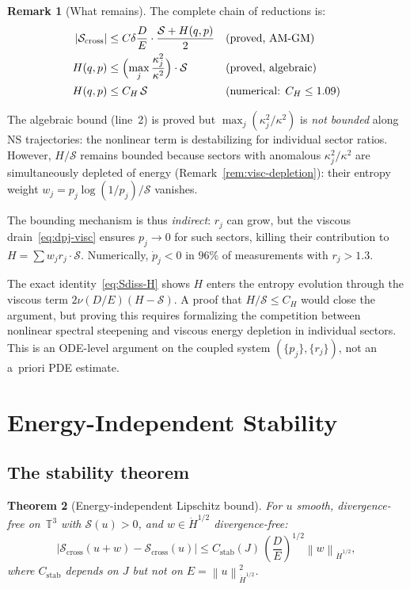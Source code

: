 \documentclass[11pt]{article}
\newtheorem{theorem}{Theorem}[section]
\theoremstyle{definition}
\newtheorem{remark}[theorem]{Remark}
\newcommand{\T}{\mathbb{T}}
\newcommand{\norm}[1]{\left\| #1 \right\|}
\newcommand{\Hdot}[1]{\dot{H}^{#1}}
\newcommand{\cS}{\mathcal{S}}
\begin{document}
\begin{remark}[What remains]
\label{rem:what-remains-prop}
The complete chain of reductions is:
\begin{align}
|\cS_{\mathrm{cross}}|
&\leq C\delta\frac{D}{E}\cdot
\frac{\cS + H(q,p)}{2}
&&\text{(proved, AM-GM)}
\nonumber\\
H(q,p) &\leq \Bigl(\max_j\frac{\kappa_j^2}{\kappa^2}\Bigr)
\cdot\cS
&&\text{(proved, algebraic)}
\nonumber\\
H(q,p) &\leq C_H\,\cS
&&\text{(numerical: $C_H \leq 1.09$)}
\end{align}

The algebraic bound (line~2) is proved but
$\max_j(\kappa_j^2/\kappa^2)$ is \emph{not bounded} along
NS trajectories: the nonlinear term is destabilizing
for individual sector ratios.  However, $H/\cS$ remains
bounded because sectors with anomalous $\kappa_j^2/\kappa^2$
are simultaneously depleted of energy
(Remark~\ref{rem:visc-depletion}): their entropy weight
$w_j = p_j\log(1/p_j)/\cS$ vanishes.

The bounding mechanism is thus \emph{indirect}: $r_j$ can
grow, but the viscous drain~\eqref{eq:dpj-visc}
ensures $p_j \to 0$ for such sectors, killing their
contribution to $H = \sum w_j r_j \cdot \cS$.
Numerically, $\dot{p}_j < 0$ in $96\%$ of measurements
with $r_j > 1.3$.

The exact identity~\eqref{eq:Sdiss-H} shows $H$ enters
the entropy evolution through the viscous term
$2\nu(D/E)(H - \cS)$.  A proof that $H/\cS \leq C_H$
would close the argument, but proving this requires
formalizing the competition between nonlinear spectral
steepening and viscous energy depletion in individual
sectors.  This is an ODE-level argument on the coupled
system $(\{p_j\}, \{r_j\})$, not an a~priori PDE estimate.
\end{remark}


\section{Energy-Independent Stability}
\label{sec:stability}

\subsection{The stability theorem}

\begin{theorem}[Energy-independent Lipschitz bound]
\label{thm:stability}
For $u$ smooth, divergence-free on~$\T^3$ with
$\cS(u) > 0$, and $w \in \Hdot{1/2}$ divergence-free:
\begin{equation}\label{eq:stability}
|\cS_{\mathrm{cross}}(u+w) - \cS_{\mathrm{cross}}(u)|
\leq C_{\mathrm{stab}}(J)\,
\left(\frac{D}{E}\right)^{1/2}\norm{w}_{\Hdot{1/2}},
\end{equation}
where $C_{\mathrm{stab}}$ depends on $J$ but
\emph{not on} $E = \norm{u}_{\Hdot{1/2}}^2$.
\end{theorem}
\end{document}
